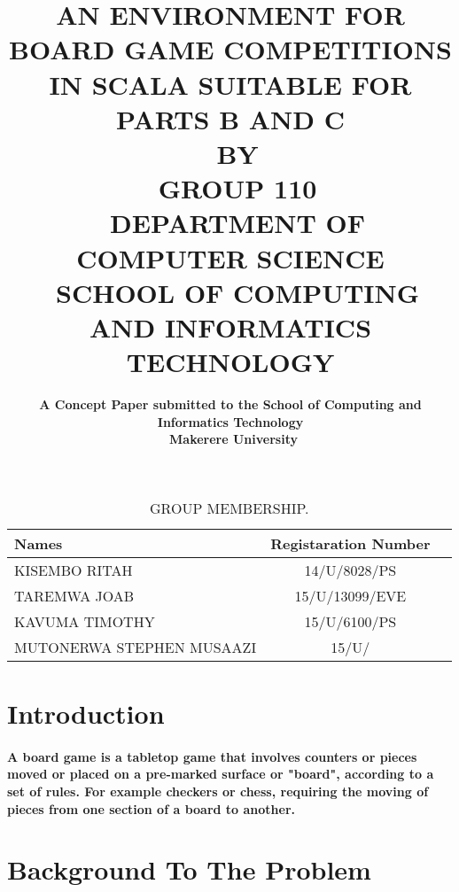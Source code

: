 \documentclass[a4paper,12pt]{report}
\begin{document}
 
\title{\textbf{\large AN ENVIRONMENT FOR BOARD GAME COMPETITIONS IN SCALA SUITABLE FOR PARTS B AND C}\vspace{12pt} \\\ \textbf{\large BY} \\\  \textbf{\large GROUP 110}\vspace{12pt}\\\  \textbf{\large DEPARTMENT OF COMPUTER SCIENCE}\vspace{12pt}\\\ \textbf{\large SCHOOL OF COMPUTING AND INFORMATICS TECHNOLOGY}}

\author {\textbf{A Concept Paper submitted to the School of Computing and Informatics Technology}\\\ \textbf{Makerere University}}

\maketitle

\begin{table}[ht!]
  \centering
  \caption{GROUP MEMBERSHIP.}
  \label{tab:table1}
  \begin{tabular}{l|c||r}
    Names & Registaration Number\\
    \hline
    KISEMBO RITAH & 14/U/8028/PS\\
    TAREMWA JOAB & 15/U/13099/EVE\\
    KAVUMA TIMOTHY & 15/U/6100/PS\\
    MUTONERWA STEPHEN MUSAAZI & 15/U/\\
  \end{tabular}
\end{table}




\section{ Introduction}

\paragraph { A board game is a tabletop game that involves counters or pieces moved or placed on a pre-marked surface or "board", according to a set of rules. For example checkers or chess, requiring the moving of pieces from one section of a board to another.}

 \section{{\large Background To The Problem}}
\end{document}
